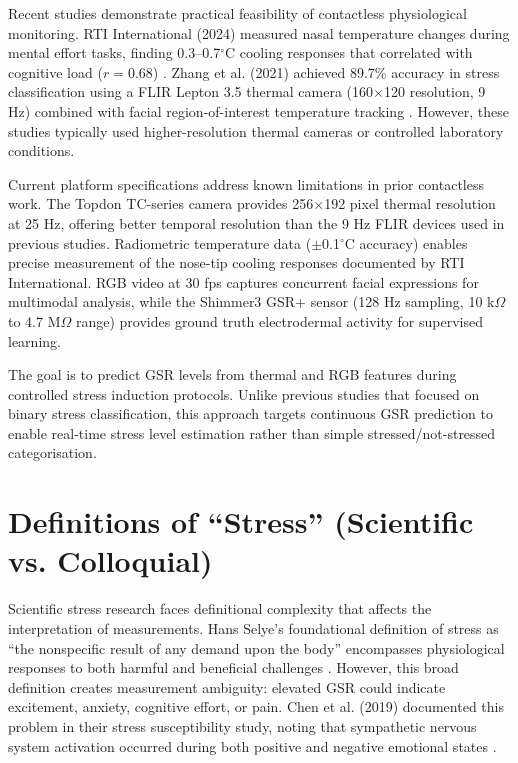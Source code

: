 Recent studies demonstrate practical feasibility of contactless physiological monitoring. RTI International (2024) measured nasal temperature changes during mental effort tasks, finding 0.3--0.7$^\circ$C cooling responses that correlated with cognitive load ($r = 0.68$) \cite{ref6}. Zhang et al. (2021) achieved 89.7\% accuracy in stress classification using a FLIR Lepton 3.5 thermal camera (160$\times$120 resolution, 9 Hz) combined with facial region-of-interest temperature tracking \cite{ref5}. However, these studies typically used higher-resolution thermal cameras or controlled laboratory conditions.

Current platform specifications address known limitations in prior contactless work. The Topdon TC-series camera provides 256$\times$192 pixel thermal resolution at 25 Hz, offering better temporal resolution than the 9 Hz FLIR devices used in previous studies. Radiometric temperature data ($\pm$0.1$^\circ$C accuracy) enables precise measurement of the nose-tip cooling responses documented by RTI International. RGB video at 30 fps captures concurrent facial expressions for multimodal analysis, while the Shimmer3 GSR+ sensor (128 Hz sampling, 10 k$\Omega$ to 4.7 M$\Omega$ range) provides ground truth electrodermal activity for supervised learning.

The goal is to predict GSR levels from thermal and RGB features during controlled stress induction protocols. Unlike previous studies that focused on binary stress classification, this approach targets continuous GSR prediction to enable real-time stress level estimation rather than simple stressed/not-stressed categorisation.


\section{Definitions of ``Stress'' (Scientific vs. Colloquial)}
Scientific stress research faces definitional complexity that affects the interpretation of measurements. Hans Selye's foundational definition of stress as ``the nonspecific result of any demand upon the body'' encompasses physiological responses to both harmful and beneficial challenges \cite{ref11}. However, this broad definition creates measurement ambiguity: elevated GSR could indicate excitement, anxiety, cognitive effort, or pain. Chen et al. (2019) documented this problem in their stress susceptibility study, noting that sympathetic nervous system activation occurred during both positive and negative emotional states \cite{ref4}.

